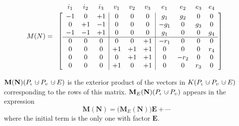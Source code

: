 \documentclass[12pt]{article}
\theoremstyle{definition}
\newcommand{\dunion}
{\mbox{\hbox{\hskip6pt$\cdot$\hskip-5.50pt$\cup$\hskip2pt}}}
\newcommand{\Is}{\ensuremath{\iota}}
\newcommand{\Vs}{\ensuremath{\upsilon}}
\newcommand{\FieldK}{\ensuremath{K}}
\newcommand{\ext}[1]{\ensuremath{\mathbf{#1}}}
\begin{document}

\[
M(N)=
\begin{array}{c}
\begin{array}{cccccccccc}
i_1 & i_2 & i_3 & v_1 & v_2 & v_3  & e_1  & e_2 & e_3 & e_4 \\[-1em]
\hphantom{+1}&\hphantom{+1}&\hphantom{+1}&
\hphantom{+1}&\hphantom{+1}&\hphantom{+1}&
\hphantom{+g_1}&\hphantom{-g_1}&\hphantom{g_3}&\hphantom{g_4}
\end{array}\\
\left[\begin{array}{ccc|ccc|cccc}
 -1 &  0  &  +1 &   0 &  0  &   0  & g_1  & g_2 &  0  & 0   \\ 
  0 & +1  &  -1 &   0 &  0  &   0  & -g_1 &   0 & g_3 & 0   \\ 
 -1 & -1  &  +1 &   0 &  0  &   0  & g_1  &   0 &  0  & g_4   \\ \hline
  0 &  0  &   0 &  0  &  0  &  +1  &-r_1  &   0 &  0  & 0 \\
  0 &  0  &   0 & +1  &  +1 &  +1  &   0  &   0 &  0  & r_4\\
  0 &  0  &   0 &  0  &  +1 &  +1  &   0  &-r_2 &  0  &  0\\
  0 &  0  &   0 & +1  &   0 &  +1  &   0  &   0 & r_3 &  0
\end{array}\right]
\end{array}
\]


$\ext{M}(\ext{N})(P_{\Is}\dunion P_{\Vs}\dunion E)$
is the exterior product of the vectors in
$\FieldK (P_{\Is}\dunion P_{\Vs}\dunion E)$ corresponding to the
rows of this matrix.
$\ext{M}_E(\ext{N})(P_{\Is}\dunion P_{\Vs})$ appears
in the expression
\[
\ext{M}(\ext{N})=\big(\ext{M}_E(\ext{N})\big)\ext{E} + \cdots
\]
where the initial term is the only one with factor $\ext{E}$.
\end{document}
